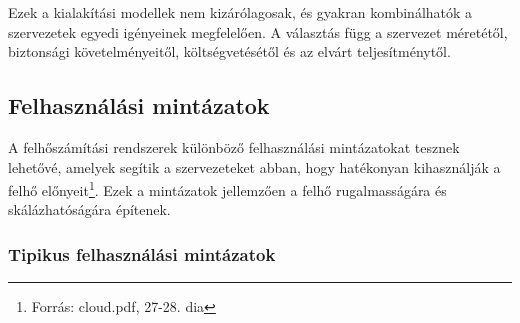 \documentclass[a4paper,12pt]{article}
\begin{document}
    Ezek a kialakítási modellek nem kizárólagosak, és gyakran kombinálhatók a szervezetek egyedi igényeinek megfelelően. A választás függ a szervezet méretétől, biztonsági követelményeitől, költségvetésétől és az elvárt teljesítménytől.

    \subsection{Felhasználási mintázatok}

    A felhőszámítási rendszerek különböző felhasználási mintázatokat tesznek lehetővé, amelyek segítik a szervezeteket abban, hogy hatékonyan kihasználják a felhő előnyeit\footnote{Forrás: cloud.pdf, 27-28. dia}. Ezek a mintázatok jellemzően a felhő rugalmasságára és skálázhatóságára építenek.

    \subsubsection{Tipikus felhasználási mintázatok}
\end{document}
